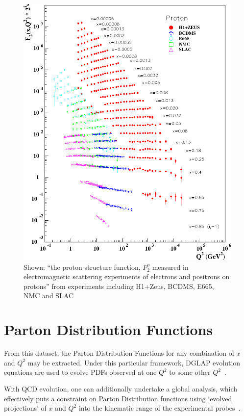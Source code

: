 \begin{figure}[ht]
  \centering
  \includegraphics[width=\linewidth]{./figures/F2_structure_function.pdf}
  \caption{
    Shown: ``the proton structure function, $F_2^p$ measured in
		electromagnetic scattering experiments of electrons and positrons on
		protons'' from experiments including H1+Zeus, BCDMS, E665, NMC and
		SLAC~\cite{ReviewEidelman2012}
  }
  \label{fig:f2_world_data}
\end{figure}

\clearpage
\section{Parton Distribution Functions}
\label{sec:parton_distribution_functions}

From this dataset, the Parton Distribution Functions for any combination of $x$
and $Q^2$ may be extracted. Under this particular framework, DGLAP evolution
equations are used to evolve PDFs observed at one $Q^2$ to some other
$Q^2$~\cite{Altarelli2009}.

With QCD evolution, one can additionally undertake a global analysis, which
effectively puts a constraint on Parton Distribution functions using `evolved
projections' of $x$ and $Q^2$ into the kinematic range of the experimental
probes~\cite{Gal2014b}. 

